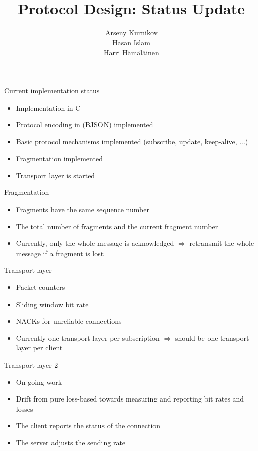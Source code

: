 \documentclass{beamer}
\title{Protocol Design: Status Update}
\author{Arseny Kurnikov\\
Hasan Islam\\
Harri Hämäläinen}
\begin{document}
\begin{frame}
\titlepage
\end{frame}

\begin{frame}{Current implementation status}
    \begin{itemize}
        \item Implementation in C
        \item Protocol encoding in (BJSON) implemented
        \item Basic protocol mechanisms implemented (subscribe, update,
        keep-alive, ...)
        \item Fragmentation implemented
        \item Transport layer is started
    \end{itemize}
\end{frame}

\begin{frame}{Fragmentation}
    \begin{itemize}
        \item Fragments have the same sequence number
        \item The total number of fragments and the current fragment number
        \item Currently, only the whole message is acknowledged $\Rightarrow$ retransmit
              the whole message if a fragment is lost
    \end{itemize}
\end{frame}

\begin{frame}{Transport layer}
    \begin{itemize}
        \item Packet counters
        \item Sliding window bit rate
        \item NACKs for unreliable connections
        \item Currently one transport layer per subscription $\Rightarrow$ should be one
              transport layer per client
    \end{itemize}
\end{frame}

\begin{frame}{Transport layer 2}
    \begin{itemize}
        \item On-going work
        \item Drift from pure loss-based towards measuring and reporting bit
              rates and losses
        \item The client reports the status of the connection
        \item The server adjusts the sending rate
    \end{itemize}
\end{frame}
\end{document}

